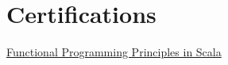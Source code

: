 \documentclass[../cv.tex]{subfiles}
\begin{document}
\hspace{0.2cm}
\begin{minipage}[t]{0.375\linewidth}
	\section{Certifications}
	\href{https://coursera.org/verify/CVTBRL4T32UJ}{Functional Programming Principles in Scala}\\
\end{minipage}
\end{document}
